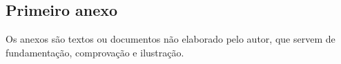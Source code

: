 \begin{anexosenv}

  \partanexos

  \chapter{Primeiro anexo}

  Os anexos são textos ou documentos não elaborado pelo autor, que servem de fundamentação, comprovação e ilustração.
\end{anexosenv}

